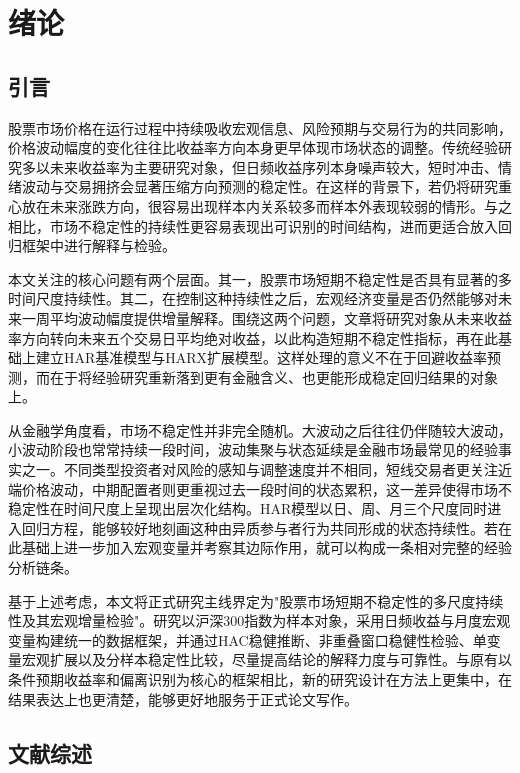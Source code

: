 
\section{绪论}

\subsection{引言}

股票市场价格在运行过程中持续吸收宏观信息、风险预期与交易行为的共同影响，价格波动幅度的变化往往比收益率方向本身更早体现市场状态的调整。传统经验研究多以未来收益率为主要研究对象，但日频收益序列本身噪声较大，短时冲击、情绪波动与交易拥挤会显著压缩方向预测的稳定性。在这样的背景下，若仍将研究重心放在未来涨跌方向，很容易出现样本内关系较多而样本外表现较弱的情形。与之相比，市场不稳定性的持续性更容易表现出可识别的时间结构，进而更适合放入回归框架中进行解释与检验。

本文关注的核心问题有两个层面。其一，股票市场短期不稳定性是否具有显著的多时间尺度持续性。其二，在控制这种持续性之后，宏观经济变量是否仍然能够对未来一周平均波动幅度提供增量解释。围绕这两个问题，文章将研究对象从未来收益率方向转向未来五个交易日平均绝对收益，以此构造短期不稳定性指标，再在此基础上建立HAR基准模型与HARX扩展模型。这样处理的意义不在于回避收益率预测，而在于将经验研究重新落到更有金融含义、也更能形成稳定回归结果的对象上。

从金融学角度看，市场不稳定性并非完全随机。大波动之后往往仍伴随较大波动，小波动阶段也常常持续一段时间，波动集聚与状态延续是金融市场最常见的经验事实之一。不同类型投资者对风险的感知与调整速度并不相同，短线交易者更关注近端价格波动，中期配置者则更重视过去一段时间的状态累积，这一差异使得市场不稳定性在时间尺度上呈现出层次化结构。HAR模型以日、周、月三个尺度同时进入回归方程，能够较好地刻画这种由异质参与者行为共同形成的状态持续性。若在此基础上进一步加入宏观变量并考察其边际作用，就可以构成一条相对完整的经验分析链条。

基于上述考虑，本文将正式研究主线界定为"股票市场短期不稳定性的多尺度持续性及其宏观增量检验"。研究以沪深300指数为样本对象，采用日频收益与月度宏观变量构建统一的数据框架，并通过HAC稳健推断、非重叠窗口稳健性检验、单变量宏观扩展以及分样本稳定性比较，尽量提高结论的解释力度与可靠性。与原有以条件预期收益率和偏离识别为核心的框架相比，新的研究设计在方法上更集中，在结果表达上也更清楚，能够更好地服务于正式论文写作。

\subsection{文献综述}

